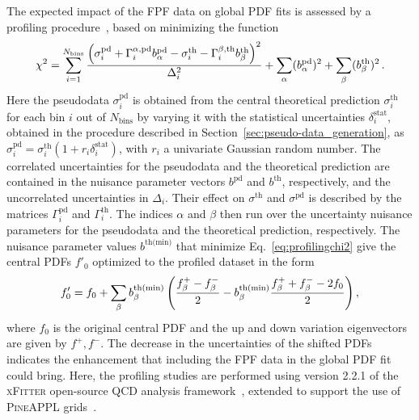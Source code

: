 \documentclass[11pt,a4paper]{article}
\def\frac#1#2{{{#1}\over {#2}}}
\numberwithin{equation}{section}
\numberwithin{figure}{section}
\numberwithin{table}{section}
\begin{document}
The expected impact of the FPF data on global PDF fits is assessed by a profiling procedure~\cite{Paukkunen:2014zia, Schmidt:2018hvu, AbdulKhalek:2018rok, HERAFitterdevelopersTeam:2015cre}, based on minimizing the function
\begin{equation}
\chi^2 = 
\sum_{i=1}^{N_{\textrm{bins}}} 
\frac{\left(  \sigma_i^{\textrm{pd}}
            + \Gamma_i^{\alpha,\textrm{pd}}
              b_\alpha^{\textrm{pd}}
            - \sigma_i^{\textrm{th}}
            - \Gamma_i^{\beta,\textrm{th}}
              b_\beta^{\textrm{th}}
     \right)^2
     }{\Delta_i^2}
+ \sum_\alpha (b_\alpha^{\textrm{pd}})^2
+ \sum_\beta  (b_\beta^{\textrm{th}})^2 \, .
\label{eq:profilingchi2}
\end{equation}
Here the pseudodata 
$\sigma_i^{\textrm{pd}}$ 
is obtained from the central theoretical prediction 
$\sigma_i^{\textrm{th}}$ 
for each bin $i$ out of $N_{\textrm{bins}}$ by varying it with the statistical uncertainties 
$\delta_i^{\textrm{stat}}$, 
obtained in the procedure described in Section~\ref{sec:pseudo-data_generation}, 
as 
$\sigma_i^{\textrm{pd}} = \sigma_i^{\textrm{th}}(1 + r_i \delta_i^{\textrm{stat}})$, 
with $r_i$ a univariate Gaussian random number.
%
The correlated uncertainties for the pseudodata and the theoretical prediction 
are contained in the nuisance parameter vectors $b^{\textrm{pd}}$ and $b^{\textrm{th}}$, respectively, and the uncorrelated uncertainties in $\Delta_i$.
%
Their effect on $\sigma^{\textrm{th}}$ and $\sigma^{\textrm{pd}}$
is described by the matrices $\Gamma_i^{\textrm{pd}}$ and $\Gamma_i^{\textrm{th}}$.
The indices $\alpha$ and $\beta$ then run over the uncertainty nuisance parameters for the pseudodata and the theoretical prediction, respectively.
%
The nuisance parameter values $b^{\textrm{th(min)}}$ that minimize Eq.~\eqref{eq:profilingchi2} give the central PDFs $f'_0$ optimized to the profiled dataset in the form
\begin{equation}
f_0' = f_0
      + \sum_\beta b_\beta^{\textrm{th(min)}} 
        \left(  \frac{f_\beta^+   -  f_\beta^- }{2}
              -    b_\beta^{\textrm{th(min)}}
                \frac{f_\beta^+ + f_\beta^- - 2f_0}{2}
        \right),
\end{equation}
where $f_0$ is the original central PDF and the up and down variation eigenvectors are given by $f^+, f^-$. The decrease in the uncertainties of the shifted PDFs indicates the enhancement that including the FPF data in the global PDF fit could bring. Here, the profiling studies are performed using version 2.2.1 of the \textsc{xFitter} open-source QCD analysis framework~\cite{Alekhin:2014irh, Bertone:2017tig, xFitter:2022zjb, xFitter:web}, extended to support the use of \textsc{PineAPPL} grids~\cite{christopher_schwan_2023_7499507, Carrazza:2020gss}.
\end{document}
